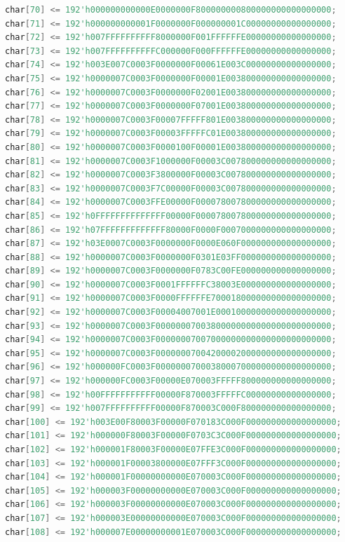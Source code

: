 \documentclass[UTF8]{article}
\theoremstyle{MyLineTheoremStyle} %
\theoremstyle{MyBlockTheoremStyle} %
\theoremstyle{MySubsubsectionStyle} %
\begin{document}
\begin{lstlisting}[language=Verilog, caption={小组成员姓名显示Verilog代码修改部分}, label={lst:verilog_code2}]
char[70] <= 192'h000000000000E0000000F800000000800000000000000000;
char[71] <= 192'h000000000001F0000000F000000001C00000000000000000;
char[72] <= 192'h007FFFFFFFFFF8000000F001FFFFFFE00000000000000000;
char[73] <= 192'h007FFFFFFFFFFC000000F000FFFFFFE00000000000000000;
char[74] <= 192'h003E007C0003F0000000F00061E003C00000000000000000;
char[75] <= 192'h0000007C0003F0000000F00001E003800000000000000000;
char[76] <= 192'h0000007C0003F0000000F02001E003800000000000000000;
char[77] <= 192'h0000007C0003F0000000F07001E003800000000000000000;
char[78] <= 192'h0000007C0003F00007FFFFF801E003800000000000000000;
char[79] <= 192'h0000007C0003F00003FFFFFC01E003800000000000000000;
char[80] <= 192'h0000007C0003F0000100F00001E003800000000000000000;
char[81] <= 192'h0000007C0003F1000000F00003C007800000000000000000;
char[82] <= 192'h0000007C0003F3800000F00003C007800000000000000000;
char[83] <= 192'h0000007C0003F7C00000F00003C007800000000000000000;
char[84] <= 192'h0000007C0003FFE00000F000078007800000000000000000;
char[85] <= 192'h0FFFFFFFFFFFFFF00000F000078007800000000000000000;
char[86] <= 192'h07FFFFFFFFFFFFF80000F0000F0007000000000000000000;
char[87] <= 192'h03E0007C0003F0000000F0000E060F000000000000000000;
char[88] <= 192'h0000007C0003F0000000F0301E03FF000000000000000000;
char[89] <= 192'h0000007C0003F0000000F0783C00FE000000000000000000;
char[90] <= 192'h0000007C0003F0001FFFFFFC38003E000000000000000000;
char[91] <= 192'h0000007C0003F0000FFFFFFE700018000000000000000000;
char[92] <= 192'h0000007C0003F00004007001E00010000000000000000000;
char[93] <= 192'h0000007C0003F00000007003800000000000000000000000;
char[94] <= 192'h0000007C0003F00000007007000000000000000000000000;
char[95] <= 192'h0000007C0003F00000007004200002000000000000000000;
char[96] <= 192'h000000FC0003F00000007000380007000000000000000000;
char[97] <= 192'h000000FC0003F00000E070003FFFFF800000000000000000;
char[98] <= 192'h00FFFFFFFFFFF00000F870003FFFFFC00000000000000000;
char[99] <= 192'h007FFFFFFFFFF00000F870003C000F800000000000000000;
char[100] <= 192'h003E00F80003F00000F070183C000F000000000000000000;
char[101] <= 192'h000000F80003F00000F0703C3C000F000000000000000000;
char[102] <= 192'h000001F80003F00000E07FFE3C000F000000000000000000;
char[103] <= 192'h000001F00003800000E07FFF3C000F000000000000000000;
char[104] <= 192'h000001F00000000000E070003C000F000000000000000000;
char[105] <= 192'h000003F00000000000E070003C000F000000000000000000;
char[106] <= 192'h000003F00000000000E070003C000F000000000000000000;
char[107] <= 192'h000003E00000000000E070003C000F000000000000000000;
char[108] <= 192'h000007E00000000001E070003C000F000000000000000000;

\end{lstlisting}
\end{document}

